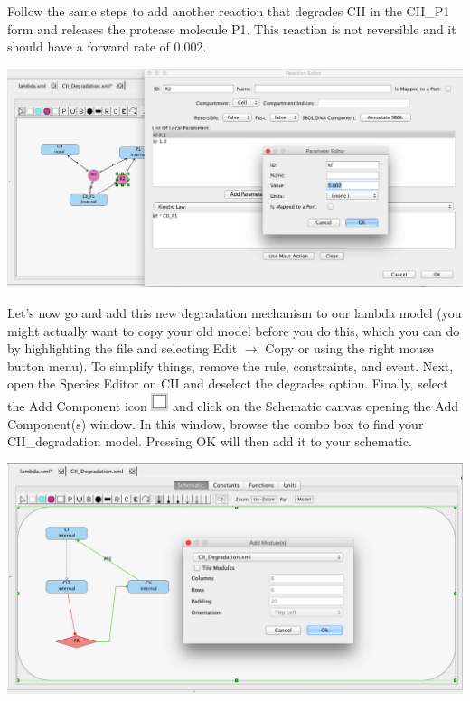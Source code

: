 \documentclass[titlepage,11pt]{article}
\begin{document}
Follow the same steps to add another reaction that degrades CII in the CII\_P1 form and releases the protease molecule P1.  This reaction is not reversible and it should have a forward rate of 0.002.

\begin{center}
\includegraphics[width=160mm]{screenshots/kineticLaw}
\end{center}

Let's now go and add this new degradation mechanism to our lambda model (you might actually want to copy your old model before you do this, which you can do by highlighting the file and selecting Edit $\rightarrow$ Copy or using the right mouse button menu).   To simplify things, remove the rule, constraints, and event.  Next, open the Species Editor on CII and deselect the degrades option.  Finally, select the Add Component icon \includegraphics{../gui/icons/modelview/add_component_selected} and click on the Schematic canvas opening the Add Component(s) window.  In this window, browse the combo box to find your CII\_degradation model.  Pressing OK will then add it to your schematic.

\begin{center}
\includegraphics[width=160mm]{screenshots/addComponent}
\end{center}
\end{document}
